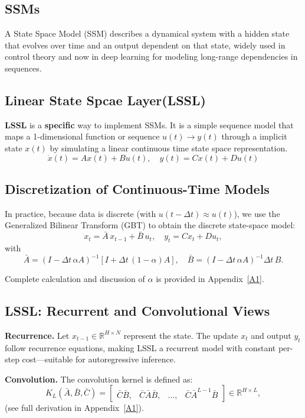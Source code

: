 \documentclass{article}
\theoremstyle{definition}
\begin{document}
\subsection{SSMs}
A State Space Model (SSM) describes a dynamical system with a hidden state that evolves over time and an output dependent on that state, widely used in control theory and now in deep learning for modeling long-range dependencies in sequences.

\subsection{Linear State Spcae Layer(LSSL)}
\textbf{LSSL } is a \textbf{specific} way to implement SSMs. It is a simple sequence model that maps a 1-dimensional function or sequence $u(t) \rightarrow y(t)$ through a implicit state $x(t)$ by simulating a linear continuous time state space representation.
\[ \dot{x}(t) = A x(t) + B u(t), \quad y(t) = C x(t) + D u(t) \]


\subsection{Discretization of Continuous-Time Models}

In practice, because data is discrete (with \( u(t-\Delta t) \approx u(t) \)), we use the Generalized Bilinear Transform (GBT) to obtain the discrete state-space model:
\[
x_t = \bar{A}\,x_{t-1} + \bar{B}\,u_t,\quad y_t = Cx_t + Du_t,
\]
with
\[
\bar{A}=(I-\Delta t\,\alpha A)^{-1}[I+\Delta t\,(1-\alpha)A],\quad \bar{B}=(I-\Delta t\,\alpha A)^{-1}\Delta t\,B.
\]

Complete calculation and discussion of $\alpha$ is provided in Appendix~\hyperref[appendix:derivation of descritizatio]{[A1]}.


\subsection{LSSL: Recurrent and Convolutional Views}

\textbf{Recurrence.}  
Let \(x_{t-1} \in \mathbb{R}^{H \times N}\) represent the state. The update \(x_t\) and output \(y_t\) follow recurrence equations, making LSSL a recurrent model with constant per-step cost—suitable for autoregressive inference.

\textbf{Convolution.}  
The convolution kernel is defined as:
\[
K_L(\bar{A}, \bar{B}, \bar{C}) = \begin{bmatrix}
\bar{C}\bar{B}, & \bar{C}\bar{A}\bar{B}, & \dots, & \bar{C}\bar{A}^{L-1}\bar{B}
\end{bmatrix} \in \mathbb{R}^{H \times L},
\]
(see full derivation in Appendix~\hyperref[appendix:derivation of descritizatio]{[A1]}).
\end{document}
